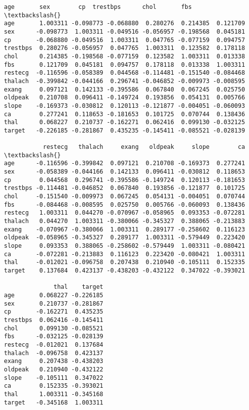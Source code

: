 \documentclass[11pt]{article}
\makeatletter
\newcommand{\boxspacing}{\kern\kvtcb@left@rule\kern\kvtcb@boxsep}
\newcommand{\prompt}[4]{
        {\ttfamily\llap{{\color{#2}[#3]:\hspace{3pt}#4}}\vspace{-\baselineskip}}
    }
\makeatother
\begin{document}
            \begin{tcolorbox}[breakable, size=fbox, boxrule=.5pt, pad at break*=1mm, opacityfill=0]
\prompt{Out}{outcolor}{8}{\boxspacing}
\begin{Verbatim}[commandchars=\\\{\}]
               age       sex        cp  trestbps      chol       fbs  \textbackslash{}
age       1.003311 -0.098773 -0.068880  0.280276  0.214385  0.121709
sex      -0.098773  1.003311 -0.049516 -0.056957 -0.198568  0.045181
cp       -0.068880 -0.049516  1.003311  0.047765 -0.077159  0.094757
trestbps  0.280276 -0.056957  0.047765  1.003311  0.123582  0.178118
chol      0.214385 -0.198568 -0.077159  0.123582  1.003311  0.013338
fbs       0.121709  0.045181  0.094757  0.178118  0.013338  1.003311
restecg  -0.116596 -0.058389  0.044568 -0.114481 -0.151540 -0.084468
thalach  -0.399842 -0.044166  0.296741 -0.046852 -0.009973 -0.008595
exang     0.097121  0.142133 -0.395586  0.067840  0.067245  0.025750
oldpeak   0.210708  0.096411 -0.149724  0.193856  0.054131  0.005766
slope    -0.169373 -0.030812  0.120113 -0.121877 -0.004051 -0.060093
ca        0.277241  0.118653 -0.181653  0.101725  0.070744  0.138436
thal      0.068227  0.210737 -0.162271  0.062416  0.099130 -0.032125
target   -0.226185 -0.281867  0.435235 -0.145411 -0.085521 -0.028139

           restecg   thalach     exang   oldpeak     slope        ca  \textbackslash{}
age      -0.116596 -0.399842  0.097121  0.210708 -0.169373  0.277241
sex      -0.058389 -0.044166  0.142133  0.096411 -0.030812  0.118653
cp        0.044568  0.296741 -0.395586 -0.149724  0.120113 -0.181653
trestbps -0.114481 -0.046852  0.067840  0.193856 -0.121877  0.101725
chol     -0.151540 -0.009973  0.067245  0.054131 -0.004051  0.070744
fbs      -0.084468 -0.008595  0.025750  0.005766 -0.060093  0.138436
restecg   1.003311  0.044270 -0.070967 -0.058965  0.093353 -0.072281
thalach   0.044270  1.003311 -0.380066 -0.345327  0.388065 -0.213883
exang    -0.070967 -0.380066  1.003311  0.289177 -0.258602  0.116123
oldpeak  -0.058965 -0.345327  0.289177  1.003311 -0.579449  0.223420
slope     0.093353  0.388065 -0.258602 -0.579449  1.003311 -0.080421
ca       -0.072281 -0.213883  0.116123  0.223420 -0.080421  1.003311
thal     -0.012021 -0.096758  0.207438  0.210940 -0.105111  0.152335
target    0.137684  0.423137 -0.438203 -0.432122  0.347022 -0.393021

              thal    target
age       0.068227 -0.226185
sex       0.210737 -0.281867
cp       -0.162271  0.435235
trestbps  0.062416 -0.145411
chol      0.099130 -0.085521
fbs      -0.032125 -0.028139
restecg  -0.012021  0.137684
thalach  -0.096758  0.423137
exang     0.207438 -0.438203
oldpeak   0.210940 -0.432122
slope    -0.105111  0.347022
ca        0.152335 -0.393021
thal      1.003311 -0.345168
target   -0.345168  1.003311
\end{Verbatim}
\end{tcolorbox}
        
\end{document}
